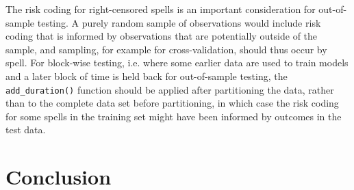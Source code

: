 \documentclass[letter]{article}
\begin{document}
The risk coding for right-censored spells is an important consideration for out-of-sample testing. A purely random sample of observations would include risk coding that is informed by observations that are potentially outside of the sample, and sampling, for example for cross-validation, should thus occur by spell. For block-wise testing, i.e. where some earlier data are used to train models and a later block of time is held back for out-of-sample testing, the \texttt{add\_duration()} function should be applied after partitioning the data, rather than to the complete data set before partitioning, in which case the risk coding for some spells in the training set might have been informed by outcomes in the test data.  

\section{Conclusion}


 

\end{document}

